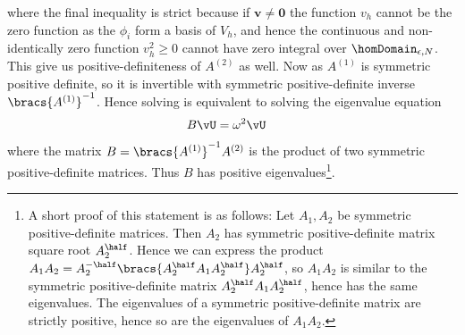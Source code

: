 where the final inequality is strict because if $\mathbf{v}\neq\mathbf{0}$ the function $v_{h}$ cannot be the zero function as the $\phi_{i}$ form a basis of $V_{h}$, and hence the continuous and non-identically zero function $v_{h}^{2}\geq0$ cannot have zero integral over $\homDomain_{\epsilon, N}$.
This give us positive-definiteness of $A^{(2)}$ as well.
Now as $A^{(1)}$ is symmetric positive definite, so it is invertible with symmetric positive-definite inverse $\bracs{A^{(1)}}^{-1}$.
Hence solving  is equivalent to solving the eigenvalue equation
\begin{align} \label{eq:BetterEvalEqn}
	B\vU &= \omega^{2}\vU
\end{align}
where the matrix $B=\bracs{A^{(1)}}^{-1}A^{(2)}$ is the product of two symmetric positive-definite matrices.
Thus $B$ has positive eigenvalues\footnote{A short proof of this statement is as follows: Let $A_{1},A_{2}$ be symmetric positive-definite matrices. Then $A_{2}$ has symmetric positive-definite matrix square root $A_{2}^{\half}$. Hence we can express the product $A_{1}A_{2} = A_{2}^{-\half}\bracs{A_{2}^{\half}A_{1}A_{2}^{\half}}A_{2}^{\half}$, so $A_{1}A_{2}$ is similar to the symmetric positive-definite matrix $A_{2}^{\half}A_{1}A_{2}^{\half}$, hence has the same eigenvalues. The eigenvalues of a symmetric positive-definite matrix are strictly positive, hence so are the eigenvalues of $A_{1}A_{2}$.}. \newline

